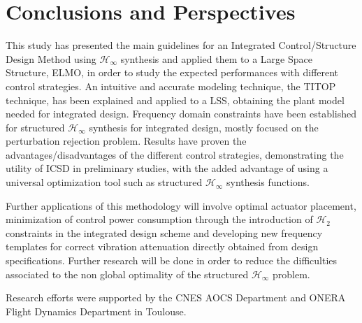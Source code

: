 \documentclass{ifacconf}
\begin{document}
\section{Conclusions and Perspectives}


This study has presented the main guidelines for an Integrated Control/Structure Design Method using $\mathcal{H_\infty}$ synthesis and applied them to a Large Space Structure, ELMO, in order to study the expected performances with different control strategies. An intuitive and accurate modeling technique, the TITOP technique, has been explained and applied to a LSS, obtaining the plant model needed for integrated design. Frequency domain constraints have been established for structured $\mathcal{H}_\infty$ synthesis for integrated design, mostly focused on the perturbation rejection problem. Results have proven the advantages/disadvantages of the different control strategies, demonstrating the utility of ICSD in preliminary studies, with the added advantage of using a universal optimization tool such as structured $\mathcal{H}_\infty$ synthesis functions. 

Further applications of this methodology will involve optimal actuator placement, minimization of control power consumption through the introduction of $\mathcal{H}_2$ constraints in the integrated design scheme and developing new frequency templates for correct vibration attenuation directly obtained from design specifications. Further research will be done in order to reduce the difficulties associated to the non global optimality of the   structured $\mathcal{H}_\infty$ problem.

\begin{ack}
Research efforts were supported by the CNES AOCS Department and ONERA Flight Dynamics Department in Toulouse.
\end{ack}

             
\end{document}
